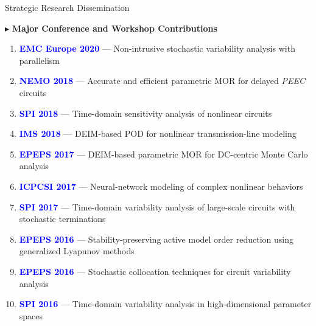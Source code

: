 \begin{frame}[t, allowframebreaks]{Strategic Research Dissemination}

	\vspace{1ex}
	{\large \textcolor{green!70!black}{$\blacktriangleright$}}
	\textbf{Major Conference and Workshop Contributions}
	\vspace{1ex}

	\begin{enumerate}
		\small
		[circle]

		\item \textbf{\textcolor{blue}{EMC Europe 2020}} — Non-intrusive stochastic variability analysis with parallelism
		\item \textbf{\textcolor{blue}{NEMO 2018}} — Accurate and efficient parametric MOR for delayed \textit{PEEC} circuits
		\item \textbf{\textcolor{blue}{SPI 2018}} — Time-domain sensitivity analysis of nonlinear circuits
		\item \textbf{\textcolor{blue}{IMS 2018}} — DEIM-based POD for nonlinear transmission-line modeling
		\item \textbf{\textcolor{blue}{EPEPS 2017}} — DEIM-based parametric MOR for DC-centric Monte Carlo analysis
		\item \textbf{\textcolor{blue}{ICPCSI 2017}} — Neural-network modeling of complex nonlinear behaviors
		\item \textbf{\textcolor{blue}{SPI 2017}} — Time-domain variability analysis of large-scale circuits with stochastic terminations
		\item \textbf{\textcolor{blue}{EPEPS 2016}} — Stability-preserving active model order reduction using generalized Lyapunov methods
		\item \textbf{\textcolor{blue}{EPEPS 2016}} — Stochastic collocation techniques for circuit variability analysis
		\item \textbf{\textcolor{blue}{SPI 2016}} — Time-domain variability analysis in high-dimensional parameter spaces

		      \framebreak


\end{enumerate}
\end{frame}
